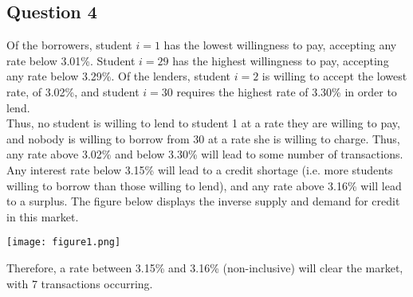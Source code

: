 \documentclass{article}
\begin{document}

\subsection*{Question 4}
Of the borrowers, student $i=1$ has the lowest willingness to pay, accepting any rate below 3.01\%. Student ${i=29}$ has the highest willingness to pay, accepting any rate below 3.29\%. Of the lenders, student ${i=2}$ is willing to accept the lowest rate, of 3.02\%, and student ${i=30}$ requires the highest rate of 3.30\% in order to lend.
\medskip \\
Thus, no student is willing to lend to student 1 at a rate they are willing to pay, and nobody is willing to borrow from 30 at a rate she is willing to charge. Thus, any rate above 3.02\% and below 3.30\% will lead to some number of transactions. Any interest rate below 3.15\% will lead to a credit shortage (i.e. more students willing to borrow than those willing to lend), and any rate above 3.16\% will lead to a surplus. The figure below displays the inverse supply and demand for credit in this market.
\begin{center}
	\texttt{[image: figure1.png]}
\end{center}
Therefore, a rate between 3.15\% and 3.16\% (non-inclusive) will clear the market, with 7 transactions occurring.



\end{document}
